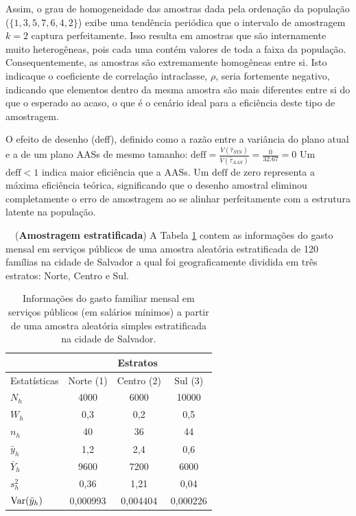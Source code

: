 \documentclass[a4paper,11pt,oneside,twocolumn]{Config/milktest}
\begin{document}
{Assim, o grau de homogeneidade das amostras dada pela ordenação da população ($\{1, 3, 5, 7, 6, 4, 2\}$) exibe uma tendência periódica que o intervalo de amostragem $k=2$ captura perfeitamente. Isso resulta em amostras que são internamente muito heterogêneas, pois cada uma contém valores de toda a faixa da população. Consequentemente, as amostras são extremamente homogêneas entre si. Isto indicaque o coeficiente de correlação intraclasse, $\rho$, seria fortemente negativo, indicando que elementos dentro da mesma amostra são mais diferentes entre si do que o esperado ao acaso, o que é o cenário ideal para a eficiência deste tipo de amostragem.

O efeito de desenho (deff), definido como a razão entre a variância do plano atual e a de um plano AASs de mesmo tamanho:
$ \text{deff} = \frac{V(\hat{\tau}_{SYS})}{V(\hat{\tau}_{AAS})} = \frac{0}{32.67} = 0 $
Um $\text{deff} < 1$ indica maior eficiência que a AASs. Um $\text{deff}$ de zero representa a máxima eficiência teórica, significando que o desenho amostral eliminou completamente o erro de amostragem ao se alinhar perfeitamente com a estrutura latente na população.
}








\medskip 
\question~~({\bf Amostragem estratificada}) A Tabela \ref{tab:2} contem as informações do gasto mensal em serviços públicos de uma amostra aleatória estratificada de 120 famílias na cidade de Salvador a qual foi geograficamente dividida em três estratos: Norte, Centro e Sul.

\begin{table}[!htb]
\begin{tabular}{l|ccc}
             & \multicolumn{3}{c}{Estratos}   \\ \hline
Estatísticas & Norte (1)   & Centro (2) & Sul (3)      \\ \hline
$N_h$        & 4000     & 6000     & 10000    \\
$W_h$        & 0,3      & 0,2      & 0,5      \\
$n_h$        & 40       & 36       & 44       \\
$\bar{y}_h$  & 1,2      & 2,4      & 0,6      \\
$\bar{Y}_h$  & 9600     & 7200     & 6000     \\
$s^2_h$             & 0,36     & 1,21     & 0,04     \\
${\rm Var}(\bar{y}_h)$          & 0,000993 & 0,004404 & 0,000226 \\ \hline
\end{tabular}
\caption{Informações do gasto familiar mensal em serviços públicos (em salários mínimos) a partir de uma amostra aleatória simples estratificada na cidade de Salvador.}
\label{tab:2}
\end{table}
\end{document}
